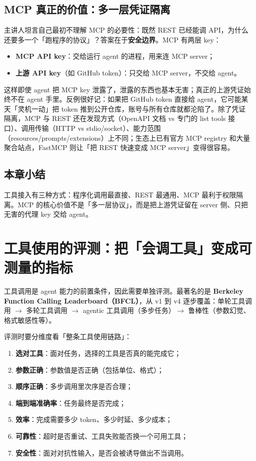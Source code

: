 \documentclass[a4paper]{article}
\begin{document}
\subsection{MCP 真正的价值：多一层凭证隔离}

主讲人坦言自己最初不理解 MCP 的必要性：既然 REST 已经能调 API，为什么还要多一个「跑程序的协议」？答案在于\textbf{安全边界}。MCP 有两层 key：

\begin{itemize}
\item \textbf{MCP API key}：交给运行 agent 的进程，用来连 MCP server；
\item \textbf{上游 API key}（如 GitHub token）：只交给 MCP server，不交给 agent。
\end{itemize}

这样即使 agent 把 MCP key 泄露了，泄露的东西也基本无害；真正的上游凭证始终不在 agent 手里。反例很好记：如果把 GitHub token 直接给 agent，它可能某天「灵机一动」把 token 推到公开仓库，账号与所有仓库就都沦陷了。除了凭证隔离，MCP 与 REST 还在发现方式（OpenAPI 文档 vs 专门的 list tools 接口）、调用传输（HTTP vs stdio/socket）、能力范围（resources/prompts/extensions）上不同；生态上已有官方 MCP registry 和大量聚合站点，FastMCP 则让「把 REST 快速变成 MCP server」变得很容易。

\subsection{本章小结}
工具接入有三种方式：程序化调用最直接、REST 最通用、MCP 最利于权限隔离。MCP 的核心价值不是「多一层协议」，而是把上游凭证留在 server 侧、只把无害的代理 key 交给 agent。

\section{工具使用的评测：把「会调工具」变成可测量的指标}

工具调用是 agent 能力的前置条件，因此需要单独评测。最著名的是 \textbf{Berkeley Function Calling Leaderboard（BFCL）}，从 v1 到 v4 逐步覆盖：单轮工具调用 $\rightarrow$ 多轮工具调用 $\rightarrow$ agentic 工具调用（多步任务）$\rightarrow$ 鲁棒性（参数幻觉、格式敏感性等）。

评测时要分维度看「整条工具使用链路」：

\begin{enumerate}
\item \textbf{选对工具}：面对任务，选择的工具是否真的能完成它；
\item \textbf{参数正确}：参数值是否正确（包括单位、格式）；
\item \textbf{顺序正确}：多步调用里次序是否合理；
\item \textbf{端到端准确率}：任务最终是否完成；
\item \textbf{效率}：完成需要多少 token、多少时延、多少成本；
\item \textbf{可靠性}：超时是否重试、工具失败能否换一个可用工具；
\item \textbf{安全性}：面对对抗性输入，是否会被诱导做出不当调用。
\end{enumerate}
\end{document}
